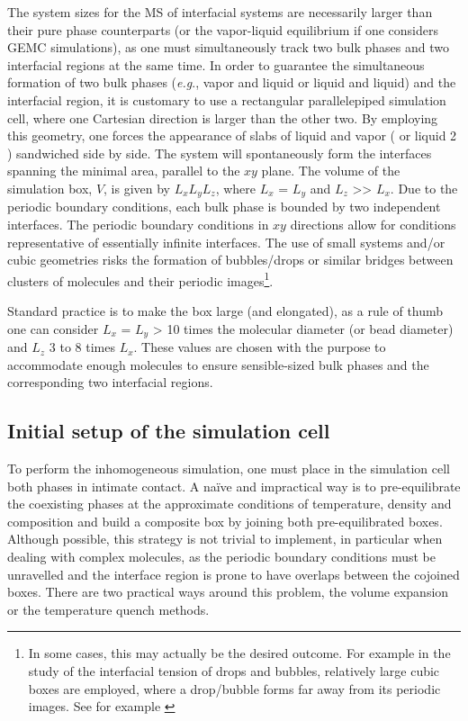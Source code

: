 \documentclass[9pt,bestpractices]{livecoms}
\begin{document}
The system sizes for the MS of interfacial systems are necessarily larger than
their pure phase counterparts (or the vapor-liquid equilibrium if one considers
GEMC simulations), as one must simultaneously track two bulk phases and two
interfacial regions at the same time. In order to guarantee the simultaneous
formation of two bulk phases (\textit{e.g}., vapor and liquid or liquid and
liquid) and the interfacial region, it is customary to use a rectangular
parallelepiped simulation cell, where one Cartesian direction is larger than
the other two. By employing this geometry, one forces the appearance of slabs
of liquid and vapor ( or liquid 2 ) sandwiched side by side. The system will
spontaneously form the interfaces spanning the minimal area, parallel to the
$xy$ plane. The volume of the simulation box, $V$, is given by
$L_{x}L_{y}L_{z}$, where $L_{x}$
= $L_{y}$ and $L_{z}$ {\textgreater}{\textgreater}
$L_{x}$. Due to the periodic boundary conditions, each bulk phase is
bounded by two independent interfaces. The periodic boundary conditions in $xy$ directions
allow for conditions representative of essentially infinite interfaces. The use of
small systems and/or cubic geometries risks the formation of bubbles/drops or
similar bridges between clusters of molecules and their periodic
images\footnote{In some cases, this may actually be the desired outcome.
For example in the study of the interfacial tension of drops and bubbles,
relatively large cubic boxes are employed, where a drop/bubble forms 
far away from its periodic images. See for example \citep{lau2015}}.

Standard practice is to make the box large (and elongated), as a rule of thumb one can consider
$L_{x}$ = $L_{y}$ {\textgreater} 10 times the molecular
diameter (or bead diameter) and $L_{z}$ 3 to 8 times
$L_{x}$. These values are chosen with the purpose to accommodate
enough molecules to ensure sensible-sized bulk phases and the corresponding two
interfacial regions. 

\subsection{Initial setup of the simulation cell}

To perform the inhomogeneous simulation, one must place in the simulation cell
both phases in intimate contact. A na\"{i}ve and impractical way is to
pre-equilibrate the coexisting phases at the approximate conditions of
temperature, density and composition and build a composite box by joining both
pre-equilibrated boxes. Although possible, this strategy is not trivial to
implement, in particular when dealing with complex molecules, as the periodic
boundary conditions must be unravelled and the interface region is prone to
have overlaps between the cojoined boxes. There are two practical ways around
this problem, the volume expansion or the temperature quench methods. 
\end{document}
